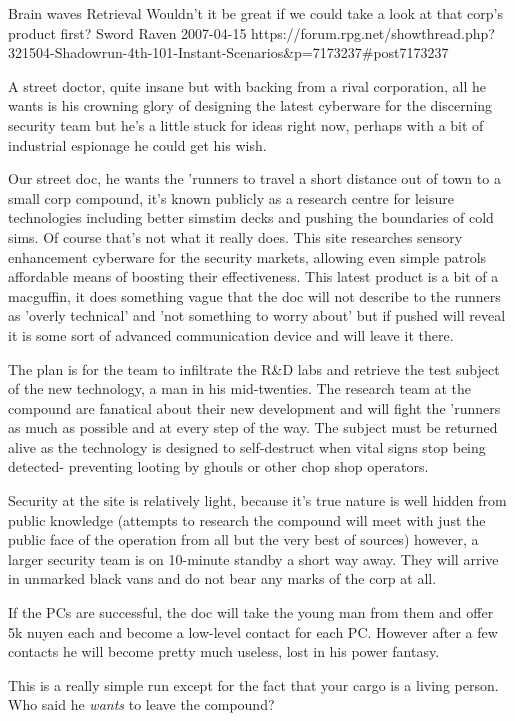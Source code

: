 \begin{scenario}{Brain waves}
	{Retrieval}
	{Wouldn't it be great if we could take a look at that corp's product first?}
	{Sword Raven}
	{2007-04-15}
	{https://forum.rpg.net/showthread.php?321504-Shadowrun-4th-101-Instant-Scenarios\&p=7173237\#post7173237}

  A street doctor, quite insane but with backing from a rival corporation, all he wants is his crowning glory of designing the latest cyberware for the discerning security team but he's a little stuck for ideas right now, perhaps with a bit of industrial espionage he could get his wish.

\synopsis Our street doc, he wants the 'runners to travel a short distance out of town to a small corp compound, it's known publicly as a research centre for leisure technologies including better simstim decks and pushing the boundaries of cold sims. Of course that's not what it really does. This site researches sensory enhancement cyberware for the security markets, allowing even simple patrols affordable means of boosting their effectiveness. This latest product is a bit of a macguffin, it does something vague that the doc will not describe to the runners as 'overly technical' and 'not something to worry about' but if pushed will reveal it is some sort of advanced communication device and will leave it there.

The plan is for the team to infiltrate the R\&D labs and retrieve the test subject of the new technology, a man in his mid-twenties. The research team at the compound are fanatical about their new development and will fight the 'runners as much as possible and at every step of the way. The subject must be returned alive as the technology is designed to self-destruct when vital signs stop being detected- preventing looting by ghouls or other chop shop operators.

Security at the site is relatively light, because it's true nature is well hidden from public knowledge (attempts to research the compound will meet with just the public face of the operation from all but the very best of sources) however, a larger security team is on 10-minute standby a short way away. They will arrive in unmarked black vans and do not bear any marks of the corp at all.

If the PCs are successful, the doc will take the young man from them and offer 5k nuyen each and become a low-level contact for each PC. However after a few contacts he will become pretty much useless, lost in his power fantasy.

\notes This is a really simple run except for the fact that your cargo is a living person. Who said he \textit{wants} to leave the compound? 

\end{scenario}